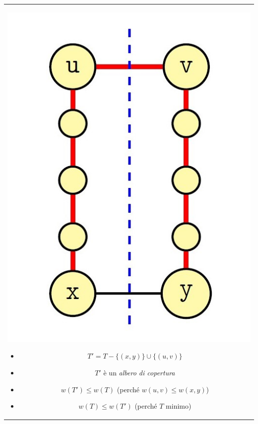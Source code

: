 \documentclass[../cheatSheetAlgoritmi.tex]{subfiles}
\begin{document}
\begin{table}[t]
\begin{tabular}{@{}c@{}}
\noindent\begin{minipage}{0.3\textwidth}
\includegraphics[width=\linewidth]{../img/Greedy_6.jpg}
\end{minipage}
\hfill
\begin{minipage}{0.6\textwidth}\raggedleft
\begin{itemize}
	\item $T' = T - \{(x, y)\} \cup \{(u, v)\}$
	\item $T'$ è un \emph{albero di copertura}
	\item $w(T') \leq w(T)$ (perché $w(u, v) \leq w(x, y)$)
	\item $w(T) \leq w(T')$ (perché $T$ minimo)
\end{itemize}
\end{minipage} 
\end{tabular}
\end{table}


\bigskip
\end{document}
